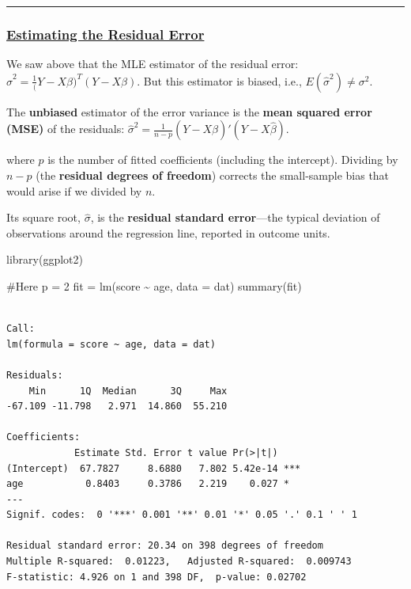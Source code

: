 \documentclass[
  letterpaper,
  DIV=11,
  numbers=noendperiod]{scrreprt}
\newenvironment{Shaded}{\begin{snugshade}}{\end{snugshade}}
\newcommand{\AttributeTok}[1]{\textcolor[rgb]{0.40,0.45,0.13}{#1}}
\newcommand{\CommentTok}[1]{\textcolor[rgb]{0.37,0.37,0.37}{#1}}
\newcommand{\FunctionTok}[1]{\textcolor[rgb]{0.28,0.35,0.67}{#1}}
\newcommand{\NormalTok}[1]{\textcolor[rgb]{0.00,0.23,0.31}{#1}}
\newcommand{\OtherTok}[1]{\textcolor[rgb]{0.00,0.23,0.31}{#1}}
\newcommand{\SpecialCharTok}[1]{\textcolor[rgb]{0.37,0.37,0.37}{#1}}
\begin{document}
\begin{center}\rule{0.5\linewidth}{0.5pt}\end{center}

\hypertarget{estimating-the-residual-error}{%
\subsubsection*{\texorpdfstring{\ul{Estimating the Residual
Error}}{Estimating the Residual Error}}\label{estimating-the-residual-error}}

We saw above that the MLE estimator of the residual error:
\(\hat{\sigma}^2 = \frac{1} (Y-X\beta)^T(Y-X\beta)\). But this estimator
is biased, i.e., \(E(\hat{\sigma}^2) \neq \sigma^2\).

The \textbf{unbiased} estimator of the error variance is the
\textbf{mean squared error (MSE)} of the residuals:
\(\hat{\sigma}^2 = \frac{1}{n-p} (Y-X\hat{\beta})'(Y-X\hat{\beta})\).

where \(p\) is the number of fitted coefficients (including the
intercept). Dividing by \(n-p\) (the \textbf{residual degrees of
freedom}) corrects the small-sample bias that would arise if we divided
by \(n\).

Its square root, \(\hat\sigma\), is the \textbf{residual standard
error}---the typical deviation of observations around the regression
line, reported in outcome units.

\begin{Shaded}
\begin{Highlighting}[]
\FunctionTok{library}\NormalTok{(ggplot2)}

\CommentTok{\#Here p = 2}
\NormalTok{fit }\OtherTok{=} \FunctionTok{lm}\NormalTok{(score }\SpecialCharTok{\textasciitilde{}}\NormalTok{ age, }\AttributeTok{data =}\NormalTok{ dat)}
\FunctionTok{summary}\NormalTok{(fit)}
\end{Highlighting}
\end{Shaded}

\begin{verbatim}

Call:
lm(formula = score ~ age, data = dat)

Residuals:
    Min      1Q  Median      3Q     Max 
-67.109 -11.798   2.971  14.860  55.210 

Coefficients:
            Estimate Std. Error t value Pr(>|t|)    
(Intercept)  67.7827     8.6880   7.802 5.42e-14 ***
age           0.8403     0.3786   2.219    0.027 *  
---
Signif. codes:  0 '***' 0.001 '**' 0.01 '*' 0.05 '.' 0.1 ' ' 1

Residual standard error: 20.34 on 398 degrees of freedom
Multiple R-squared:  0.01223,   Adjusted R-squared:  0.009743 
F-statistic: 4.926 on 1 and 398 DF,  p-value: 0.02702
\end{verbatim}
\end{document}
